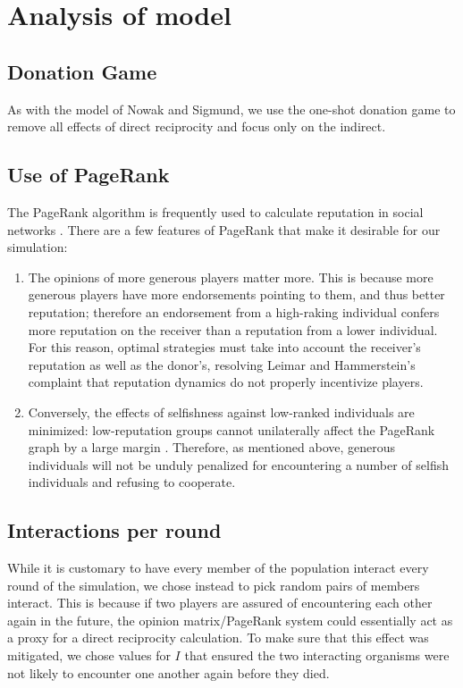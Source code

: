 \documentclass{amsart}
\begin{document}
\section{Analysis of model}
\label{sec:analysis}
\subsection{Donation Game}
As with the model of Nowak and Sigmund, we use the one-shot donation game to remove all effects of direct reciprocity and focus only on the indirect. 

\subsection{Use of PageRank}
\label{sec:whypagerank}

The PageRank algorithm is frequently used to calculate reputation in
social networks \cite{pujol_extracting_2002}. There are a few features
of PageRank that make it desirable for our simulation:
\begin{enumerate}
\item
The opinions of more generous players matter more. This is because
more generous players have more endorsements pointing to them, and
thus better reputation; therefore an endorsement from a high-raking
individual confers more reputation on the receiver than a reputation
from a lower individual. For this reason, optimal strategies must take
into account the receiver's reputation as well as the donor's,
resolving Leimar and Hammerstein's complaint
\cite{leimar_evolution_2001} that reputation dynamics do not properly
incentivize players.
\item
Conversely, the effects of selfishness against low-ranked individuals
are minimized: low-reputation groups cannot unilaterally affect the
PageRank graph by a large margin
\cite{langville_deeper_2004}. Therefore, as mentioned above, generous
individuals will not be unduly penalized for encountering a number of
selfish individuals and refusing to cooperate.
\end{enumerate}

\subsection{Interactions per round}
\label{sec:inter_per_round}

While it is customary to have every member of the population interact
every round of the simulation, we chose instead to pick random pairs
of members interact. This is because if two players are assured of
encountering each other again in the future, the opinion
matrix/PageRank system could essentially act as a proxy for a direct
reciprocity calculation. To make sure that this effect was mitigated,
we chose values for $I$ that ensured the two interacting organisms
were not likely to encounter one another again before they died.
\end{document}
